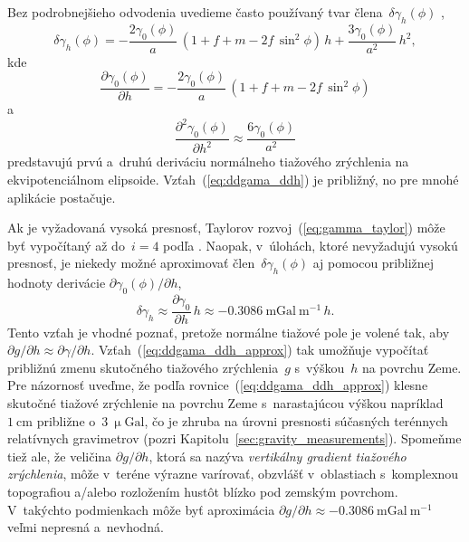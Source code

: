 \documentclass[a4paper,12pt]{book}
\begin{document}
Bez podrobnejšieho odvodenia uvedieme často používaný tvar 
člena~$\delta\gamma_h(\phi)$ \parencite[pozri 
napríklad][]{MoritzPhysicalGeodesy},
%
\begin{equation}
\delta\gamma_h(\phi) = -\frac{2\gamma_0(\phi)}{a} \, (1 + f + m - 2f \, 
\sin^2\phi) \, h + \frac{3\gamma_0(\phi)}{a^2} \, h^2{,}
\end{equation}
%
kde
%
\begin{equation}
\frac{\partial \gamma_0(\phi)}{\partial h} = -\frac{2\gamma_0(\phi)}{a} \, (1 
+ f + m - 2f \, \sin^2\phi)
\end{equation}
%
a
%
\begin{equation}
\label{eq:ddgama_ddh}
\frac{\partial^2 \gamma_0(\phi)}{\partial h^2} \approx 
\frac{6\gamma_0(\phi)}{a^2}
\end{equation}
%
predstavujú prvú a~druhú deriváciu normálneho tiažového zrýchlenia na 
ekvipotenciálnom elipsoide.  Vzťah~(\ref{eq:ddgama_ddh}) je približný, no pre 
mnohé aplikácie postačuje.

Ak je vyžadovaná vysoká presnosť, Taylorov rozvoj~(\ref{eq:gamma_taylor}) môže 
byť vypočítaný až do~$i = 4$ podľa \textcite{Pick2000}.  Naopak, v~úlohách, 
ktoré nevyžadujú vysokú presnosť, je niekedy možné aproximovať 
člen~$\delta\gamma_h(\phi)$ aj pomocou približnej hodnoty derivácie $\partial 
\gamma_0(\phi) \slash \partial h$,
%
\begin{equation}
\label{eq:ddgama_ddh_approx}
\delta\gamma_h \approx \frac{\partial \gamma_0}{\partial h} \, h \approx 
-0.3086 \ \mathrm{mGal} \ \mathrm{m}^{-1} \, h{.}
\end{equation}
%
Tento vzťah je vhodné poznať, pretože normálne tiažové pole je volené tak, aby 
$\partial g \slash \partial h \approx \partial \gamma \slash \partial h$.  
Vzťah~(\ref{eq:ddgama_ddh_approx}) tak umožňuje vypočítať približnú zmenu 
skutočného tiažového zrýchlenia~$g$ s~výškou~$h$ na povrchu Zeme.  Pre 
názornosť uveďme, že podľa rovnice~(\ref{eq:ddgama_ddh_approx}) klesne skutočné 
tiažové zrýchlenie na povrchu Zeme s~narastajúcou výškou napríklad~$1 
\ \mathrm{cm}$ približne o~$3 \ \upmu\mathrm{Gal}$, čo je zhruba na úrovni 
presnosti súčasných terénnych relatívnych gravimetrov (pozri 
Kapitolu~\ref{sec:gravity_measurements}).  Spomeňme tiež ale, že veličina 
$\partial g \slash \partial h$, ktorá sa nazýva \emph{vertikálny gradient 
tiažového zrýchlenia}, môže v~teréne výrazne varírovať, obzvlášť v~oblastiach 
s~komplexnou topografiou a/alebo rozložením hustôt blízko pod zemským povrchom.  
V~takýchto podmienkach môže byť aproximácia $\partial g \slash \partial 
h \approx -0.3086 \ \mathrm{mGal} \ \mathrm{m}^{-1}$ veľmi nepresná a~nevhodná.
\end{document}
